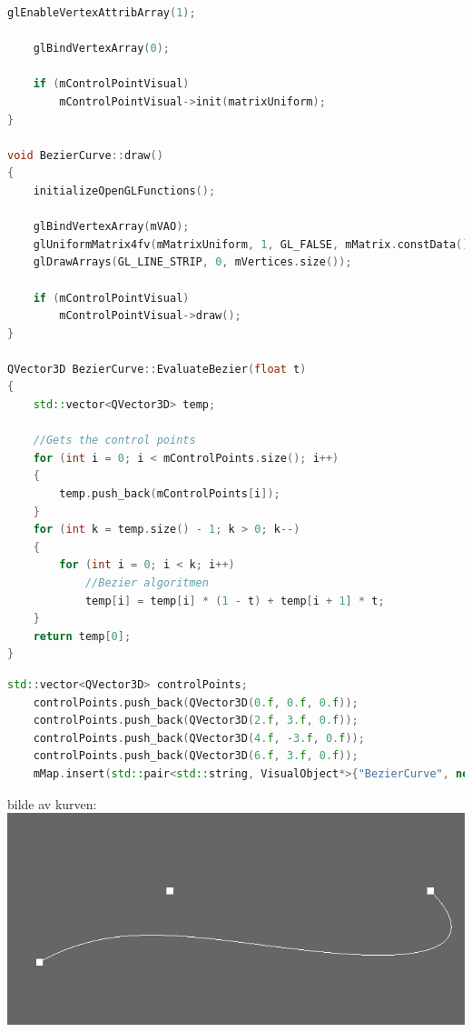 \documentclass[a4paper,norsk]{article}
\begin{document}
\begin{lstlisting}[language=C++, caption={beziercurve.cpp}]
    glEnableVertexAttribArray(1);

    glBindVertexArray(0);

    if (mControlPointVisual)
        mControlPointVisual->init(matrixUniform);
}

void BezierCurve::draw() 
{
    initializeOpenGLFunctions();

    glBindVertexArray(mVAO);
    glUniformMatrix4fv(mMatrixUniform, 1, GL_FALSE, mMatrix.constData());
    glDrawArrays(GL_LINE_STRIP, 0, mVertices.size());

    if (mControlPointVisual)
        mControlPointVisual->draw();
}

QVector3D BezierCurve::EvaluateBezier(float t)
{
    std::vector<QVector3D> temp;

    //Gets the control points
    for (int i = 0; i < mControlPoints.size(); i++)
    {
        temp.push_back(mControlPoints[i]);
    }
    for (int k = temp.size() - 1; k > 0; k--)
    {
        for (int i = 0; i < k; i++)
            //Bezier algoritmen
            temp[i] = temp[i] * (1 - t) + temp[i + 1] * t;
    }
    return temp[0];
}
\end{lstlisting}
\begin{lstlisting}[language=C++, caption={renderwindow.cpp}]
    std::vector<QVector3D> controlPoints;
    controlPoints.push_back(QVector3D(0.f, 0.f, 0.f));
    controlPoints.push_back(QVector3D(2.f, 3.f, 0.f));
    controlPoints.push_back(QVector3D(4.f, -3.f, 0.f));
    controlPoints.push_back(QVector3D(6.f, 3.f, 0.f));
    mMap.insert(std::pair<std::string, VisualObject*>{"BezierCurve", new BezierCurve(controlPoints)});
\end{lstlisting}
bilde av kurven:
\centering
\includegraphics[width=\textwidth]{kurve3}
\end{document}
